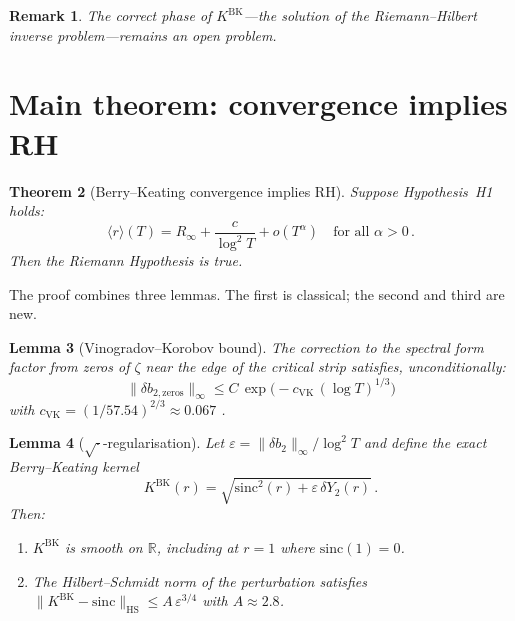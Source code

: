 \documentclass[10pt]{article}
\newtheorem{theorem}{Theorem}[section]
\newtheorem{lemma}[theorem]{Lemma}
\newtheorem{remark}[theorem]{Remark}
\begin{document}
\begin{remark}
The correct phase of $K^{\mathrm{BK}}$---the solution of the
Riemann--Hilbert inverse problem---remains an open problem.
\end{remark}


\section{Main theorem: convergence implies RH}
\label{sec:proof}

\begin{theorem}[Berry--Keating convergence implies RH]\label{thm:main}
Suppose Hypothesis~H1 holds:
\begin{equation}
\langle r\rangle(T) = R_\infty + \frac{c}{\log^2 T} + o(T^\alpha)
\quad\text{for all } \alpha > 0\,.
\tag{H1}
\label{eq:H1}
\end{equation}
Then the Riemann Hypothesis is true.
\end{theorem}

The proof combines three lemmas. The first is classical; the second and
third are new.

\begin{lemma}[Vinogradov--Korobov bound]\label{lem:VK}
The correction to the spectral form factor from zeros of $\zeta$ near the
edge of the critical strip satisfies, unconditionally:
\begin{equation}
\|\delta b_{2,\mathrm{zeros}}\|_\infty
\leq C\,\exp\!\bigl(-c_{\mathrm{VK}}\,(\log T)^{1/3}\bigr)
\end{equation}
with $c_{\mathrm{VK}} = (1/57.54)^{2/3} \approx 0.067$
\textup{\cite{vinogradov1958, yang2024}}.
\end{lemma}

\begin{lemma}[$\sqrt{\cdot}$-regularisation]\label{lem:sqrt}
Let $\varepsilon = \|\delta b_2\|_\infty / \log^2 T$ and define the exact
Berry--Keating kernel
\begin{equation}
K^{\mathrm{BK}}(r) = \sqrt{\mathrm{sinc}^2(r)
+ \varepsilon\,\delta Y_2(r)}\,.
\label{eq:KBK}
\end{equation}
Then:
\begin{enumerate}
\item[\textup{(a)}] $K^{\mathrm{BK}}$ is smooth on $\mathbb{R}$, including
at $r = 1$ where $\mathrm{sinc}(1) = 0$.
\item[\textup{(b)}] The Hilbert--Schmidt norm of the perturbation satisfies
$\|K^{\mathrm{BK}} - \mathrm{sinc}\|_{\mathrm{HS}} \leq A\,\varepsilon^{3/4}$
with $A \approx 2.8$.
\end{enumerate}
\end{lemma}
\end{document}
